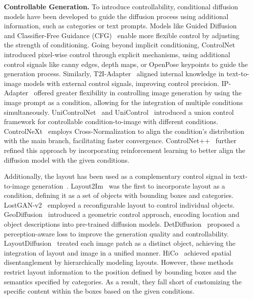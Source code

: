 \noindent\textbf{Controllable Generation.} 
To introduce controllability, conditional diffusion models have been developed to guide the diffusion process using additional information, such as categories or text prompts. Models like Guided Diffusion~\cite{nichol2021glide} and Classifier-Free Guidance (CFG)~\cite{ho2021classifierfree} enable more flexible control by adjusting the strength of conditioning.
Going beyond implicit conditioning, ControlNet~\cite{zhang2023adding} introduced pixel-wise control through explicit mechanisms, using additional control signals like canny edges, depth maps, or OpenPose keypoints to guide the generation process. 
Similarly, T2I-Adapter~\cite{mou2024t2i} aligned internal knowledge in text-to-image models with external control signals, improving control precision.
IP-Adapter~\cite{ye2023ip} offered greater flexibility in controlling image generation by using the image prompt as a condition, allowing for the integration of multiple conditions simultaneously.
UniControlNet~\cite{zhao2023uni} and UniControl~\cite{qin2023unicontrol} introduced a union control framework for controllable condition-to-image with different conditions.
ControlNeXt~\cite{peng2024controlnext} employs Cross-Normalization to align the condition’s distribution with the main branch, facilitating faster convergence. ControlNet++~\cite{li2025controlnet} further refined this approach by incorporating reinforcement learning to better align the diffusion model with the given conditions.

Additionally, the layout has been used as a complementary control signal in text-to-image generation~\cite{karacan2016learning, reed2016learning,wang2022interactive}. 
Layout2Im~\cite{zhao2020layout2image} was the first to incorporate layout as a condition, defining it as a set of objects with bounding boxes and categories. 
%
LostGAN-v2~\cite{sun2021learning} employed a reconfigurable layout to control individual objects. 
%
GeoDiffusion~\cite{chen2024geodiffusion} introduced a geometric control approach, encoding location and object descriptions into pre-trained diffusion models. 
DetDiffusion~\cite{wang2024detdiffusion} proposed a perception-aware loss to improve the generation quality and controllability.
LayoutDiffusion~\cite{zheng2023layoutdiffusion} treated each image patch as a distinct object, achieving the integration of layout and image in a unified manner. 
HiCo~\cite{cheng2024hico} achieved spatial disentanglement by hierarchically modeling layouts.
However, these methods restrict layout information to the position defined by bounding boxes and the semantics specified by categories. As a result, they fall short of customizing the specific content within the boxes based on the given conditions.

